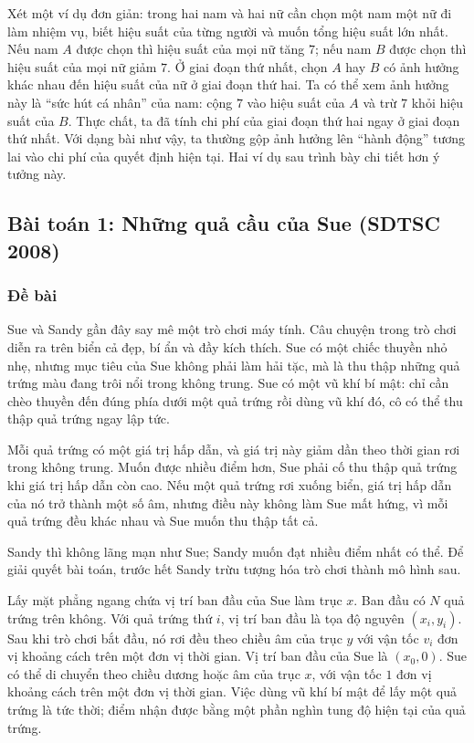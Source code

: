 \documentclass[11pt]{article}
\begin{document}
Xét một ví dụ đơn giản: trong hai nam và hai nữ cần chọn một nam một nữ đi làm
nhiệm vụ, biết hiệu suất của từng người và muốn tổng hiệu suất lớn nhất. Nếu
nam $A$ được chọn thì hiệu suất của mọi nữ tăng $7$; nếu nam $B$ được chọn thì
hiệu suất của mọi nữ giảm $7$. Ở giai đoạn thứ nhất, chọn $A$ hay $B$ có ảnh
hưởng khác nhau đến hiệu suất của nữ ở giai đoạn thứ hai. Ta có thể xem ảnh
hưởng này là ``sức hút cá nhân'' của nam: cộng $7$ vào hiệu suất của $A$ và
trừ $7$ khỏi hiệu suất của $B$. Thực chất, ta đã tính chi phí của giai đoạn
thứ hai ngay ở giai đoạn thứ nhất. Với dạng bài như vậy, ta thường gộp ảnh
hưởng lên ``hành động'' tương lai vào chi phí của quyết định hiện tại. Hai ví
dụ sau trình bày chi tiết hơn ý tưởng này.

\subsection{Bài toán 1: Những quả cầu của Sue (SDTSC 2008)}

\subsubsection*{Đề bài}

Sue và Sandy gần đây say mê một trò chơi máy tính. Câu chuyện trong trò chơi
diễn ra trên biển cả đẹp, bí ẩn và đầy kích thích. Sue có một chiếc thuyền nhỏ
nhẹ, nhưng mục tiêu của Sue không phải làm hải tặc, mà là thu thập những quả
trứng màu đang trôi nổi trong không trung. Sue có một vũ khí bí mật: chỉ cần
chèo thuyền đến đúng phía dưới một quả trứng rồi dùng vũ khí đó, cô có thể thu
thập quả trứng ngay lập tức.

Mỗi quả trứng có một giá trị hấp dẫn, và giá trị này giảm dần theo thời gian
rơi trong không trung. Muốn được nhiều điểm hơn, Sue phải cố thu thập quả
trứng khi giá trị hấp dẫn còn cao. Nếu một quả trứng rơi xuống biển, giá trị
hấp dẫn của nó trở thành một số âm, nhưng điều này không làm Sue mất hứng, vì
mỗi quả trứng đều khác nhau và Sue muốn thu thập tất cả.

Sandy thì không lãng mạn như Sue; Sandy muốn đạt nhiều điểm nhất có thể. Để
giải quyết bài toán, trước hết Sandy trừu tượng hóa trò chơi thành mô hình
sau.

Lấy mặt phẳng ngang chứa vị trí ban đầu của Sue làm trục $x$. Ban đầu có $N$
quả trứng trên không. Với quả trứng thứ $i$, vị trí ban đầu là tọa độ nguyên
$(x_i,y_i)$. Sau khi trò chơi bắt đầu, nó rơi đều theo chiều âm của trục $y$
với vận tốc $v_i$ đơn vị khoảng cách trên một đơn vị thời gian. Vị trí ban đầu
của Sue là $(x_0,0)$. Sue có thể di chuyển theo chiều dương hoặc âm của trục
$x$, với vận tốc $1$ đơn vị khoảng cách trên một đơn vị thời gian. Việc dùng
vũ khí bí mật để lấy một quả trứng là tức thời; điểm nhận được bằng một phần
nghìn tung độ hiện tại của quả trứng.
\end{document}
